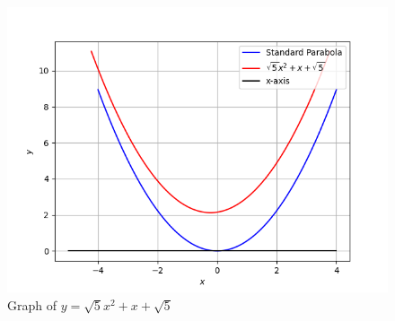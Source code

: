  \begin{figure}[!ht]
\centering
 \includegraphics[width=\columnwidth]{solutions/sep/2/23/graph.png}
 \caption{Graph of $ y = \sqrt{5}x^2 + x + \sqrt{5} $}
 \label{sep/2/23/fig}
 \end{figure}

